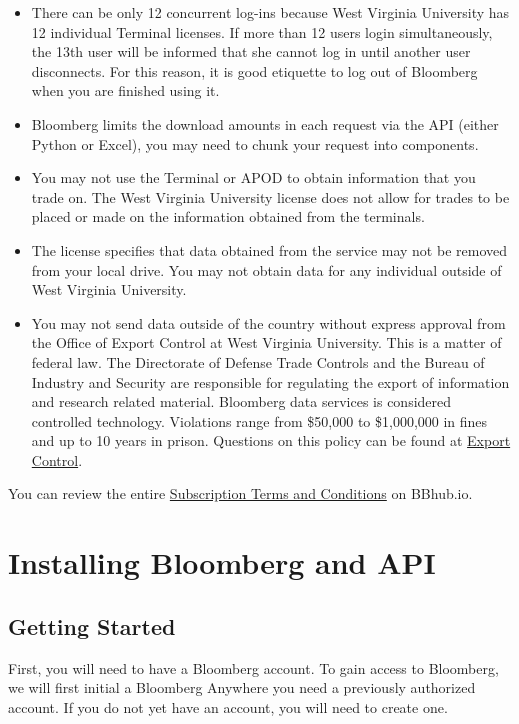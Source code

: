 \documentclass[]{book}
\providecommand{\tightlist}{%
  \setlength{\itemsep}{0pt}\setlength{\parskip}{0pt}}
\begin{document}
\begin{itemize}
\tightlist
\item
  There can be only 12 concurrent log-ins because West Virginia
  University has 12 individual Terminal licenses. If more than 12 users
  login simultaneously, the 13th user will be informed that she cannot
  log in until another user disconnects. For this reason, it is good
  etiquette to log out of Bloomberg when you are finished using it.
\item
  Bloomberg limits the download amounts in each request via the API
  (either Python or Excel), you may need to chunk your request into
  components.
\item
  You may not use the Terminal or APOD to obtain information that you
  trade on. The West Virginia University license does not allow for
  trades to be placed or made on the information obtained from the
  terminals.
\item
  The license specifies that data obtained from the service may not be
  removed from your local drive. You may not obtain data for any
  individual outside of West Virginia University.
\item
  You may not send data outside of the country without express approval
  from the Office of Export Control at West Virginia University. This is
  a matter of federal law. The Directorate of Defense Trade Controls and
  the Bureau of Industry and Security are responsible for regulating the
  export of information and research related material. Bloomberg data
  services is considered controlled technology. Violations range from
  \$50,000 to \$1,000,000 in fines and up to 10 years in prison.
  Questions on this policy can be found at
  \href{https://exportcontrol.wvu.edu/}{Export Control}.
\end{itemize}

You can review the entire
\href{http://www.bbhub.io/bnef/sites/4/2012/12/Bloomberg_Finance_L1.P-Standard-S.pdf}{Subscription
Terms and Conditions} on BBhub.io.

\chapter{Installing Bloomberg and API}\label{Install}

\section{Getting Started}\label{getting-started}

First, you will need to have a Bloomberg account. To gain access to
Bloomberg, we will first initial a Bloomberg Anywhere you need a
previously authorized account. If you do not yet have an account, you
will need to create one.
\end{document}
